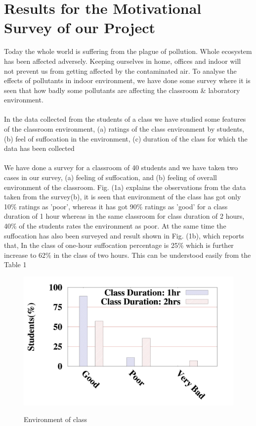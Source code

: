 \section{Results for the Motivational Survey of our Project}

Today the whole world is suffering from the plague of pollution. Whole ecosystem has been affected adversely. Keeping ourselves in home, offices and indoor will not prevent us from getting affected by the contaminated air. To analyse the effects of pollutants in indoor environment, we have done some survey where it is seen that how badly some pollutants are affecting the classroom \& laboratory environment.
\\
\\
In the data collected from the students of a class we have studied some features of the classroom environment, (a) ratings of the class environment by students, (b) feel of suffocation in the environment, (c) duration of the class for which the data has been collected
\\
\\
We have done a survey for a classroom of 40 students and we have taken two cases in our survey, (a) feeling of suffocation, and (b) feeling of overall environment of the classroom. Fig. (1a) explains the observations from the data taken from the survey(b), it is seen that environment of the class has got only 10\% ratings as ’poor’, whereas it has got 90\% ratings as ’good’ for a class duration of 1 hour whereas in the same classroom for class duration of 2 hours, 40\% of the students rates the environment as poor. At the same time the suffocation has also been surveyed and result shown in Fig. (1b), which reports that, In the class of one-hour suffocation percentage is 25\% which is further increase to 62\% in the class of two hours. This can be understood easily from the Table 1
\begin{figure}
\centering
\includegraphics[width=1.0\textwidth]{./Ratings_1hr_2hrs}\\[0.1in]
\label{fig:Environment of class}
\caption{Environment of class}
\end{figure}

